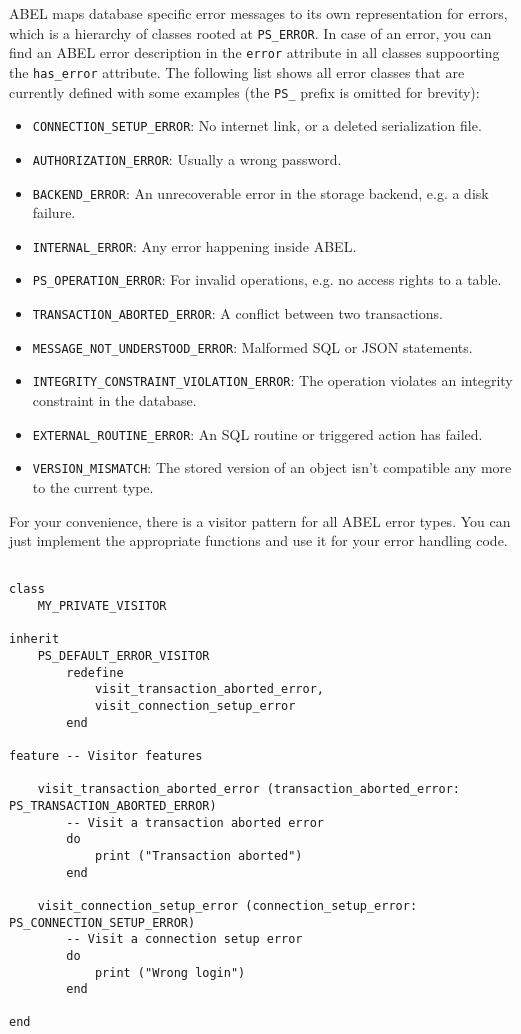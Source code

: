 \documentclass[a4paper,12pt]{report}
\begin{document}
ABEL maps database specific error messages to its own representation for errors, which is a hierarchy of classes rooted at \lstinline!PS_ERROR!.
In case of an error, you can find an ABEL error description in the \lstinline!error! attribute in all classes suppoorting the \lstinline!has_error! attribute.
The following list shows all error classes that are currently defined with some examples (the \lstinline!PS_! prefix is omitted for brevity):

\begin{itemize}
\item \lstinline!CONNECTION_SETUP_ERROR!: No internet link, or a deleted serialization file.
\item \lstinline!AUTHORIZATION_ERROR!: Usually a wrong password.
\item \lstinline!BACKEND_ERROR!: An unrecoverable error in the storage backend, e.g. a disk failure.
\item \lstinline!INTERNAL_ERROR!: Any error happening inside ABEL.
\item \lstinline!PS_OPERATION_ERROR!: For invalid operations, e.g. no access rights to a table.
\item \lstinline!TRANSACTION_ABORTED_ERROR!: A conflict between two transactions.
\item \lstinline!MESSAGE_NOT_UNDERSTOOD_ERROR!: Malformed SQL or JSON statements.
\item \lstinline!INTEGRITY_CONSTRAINT_VIOLATION_ERROR!: The operation violates an integrity constraint in the database.
\item \lstinline!EXTERNAL_ROUTINE_ERROR!: An SQL routine or triggered action has failed.
\item \lstinline!VERSION_MISMATCH!: The stored version of an object isn't compatible any more to the current type.
\end{itemize}

For your convenience, there is a visitor pattern for all ABEL error types. 
You can just implement the appropriate functions and use it for your error handling code.

\begin{lstlisting}[language=OOSC2Eiffel, captionpos=b, caption={Sample error handling using a visitor.}, label={lst:error_visitor_example}]

class
	MY_PRIVATE_VISITOR

inherit
	PS_DEFAULT_ERROR_VISITOR
		redefine
			visit_transaction_aborted_error,
			visit_connection_setup_error
		end

feature -- Visitor features

	visit_transaction_aborted_error (transaction_aborted_error: PS_TRANSACTION_ABORTED_ERROR)
		-- Visit a transaction aborted error
		do
			print ("Transaction aborted")
		end

	visit_connection_setup_error (connection_setup_error: PS_CONNECTION_SETUP_ERROR)
		-- Visit a connection setup error
		do
			print ("Wrong login")
		end

end

\end{lstlisting}
\end{document}
